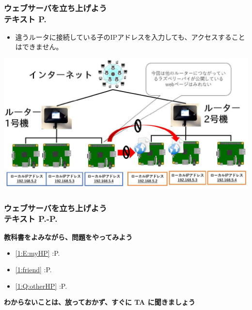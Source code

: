 \begin{frame}[fragile]
	\frametitle{ウェブサーバを立ち上げよう\\テキスト P.\pageref{1:P:HP}~~~}
            \begin{itemize}\small 
                \item 違うルータに接続している子のIPアドレスを入力しても、アクセスすることはできません。
            \end{itemize}
			\begin{minipage}{\textwidth}
                {\upshape
                  \includegraphics[width=\textwidth]{text07-img/ome7-img045}}
            \end{minipage}
\end{frame}

\begin{frame}[fragile]
	\frametitle{ウェブサーバを立ち上げよう\\テキスト P.\pageref{1:P:HP}-P.\pageref{1:P:CGI}~~~}
      \large\textbf{教科書をよみながら、問題をやってみよう}
				\begin{itemize}\small
					\item \ref*{1:E:myHP} :P.\pageref{1:E:myHP}
					\item \ref*{1:friend} :P.\pageref{1:friend}
					\item \ref*{1:Q:otherHP} :P.\pageref{1:Q:otherHP}
				\end{itemize}
      \vfill
      \large\textbf{わからないことは、放っておかず、すぐに TA に聞きましょう}
\end{frame}
